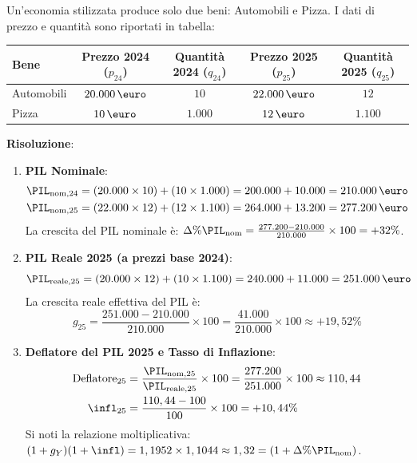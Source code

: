 \begin{esercizio}
Un'economia stilizzata produce solo due beni: Automobili e Pizza. I dati di prezzo e quantità sono riportati in tabella:
\begin{center}
\small
\begin{tabular}{lcccc}
\toprule
\textbf{Bene} & \textbf{Prezzo 2024 ($p_{24}$)} & \textbf{Quantità 2024 ($q_{24}$)} & \textbf{Prezzo 2025 ($p_{25}$)} & \textbf{Quantità 2025 ($q_{25}$)} \\
\midrule
Automobili & $20.000\,\text{\euro}$ & $10$ & $22.000\,\text{\euro}$ & $12$ \\
Pizza      & $10\,\text{\euro}$     & $1.000$ & $12\,\text{\euro}$     & $1.100$ \\
\bottomrule
\end{tabular}
\end{center}

\textbf{Risoluzione}:
\begin{enumerate}
    \item \textbf{PIL Nominale}:
    \begin{align*}
        \PIL_{\text{nom}, 24} &= (20.000 \times 10) + (10 \times 1.000) = 200.000 + 10.000 = 210.000\,\text{\euro} \\
        \PIL_{\text{nom}, 25} &= (22.000 \times 12) + (12 \times 1.100) = 264.000 + 13.200 = 277.200\,\text{\euro}
    \end{align*}
    La crescita del PIL nominale è: $\Delta\% \PIL_{\text{nom}} = \frac{277.200 - 210.000}{210.000} \times 100 = +32\%$.
    
    \item \textbf{PIL Reale 2025 (a prezzi base 2024)}:
    \begin{equation*}
        \PIL_{\text{reale}, 25} = (20.000 \times 12) + (10 \times 1.100) = 240.000 + 11.000 = 251.000\,\text{\euro}
    \end{equation*}
    La crescita reale effettiva del PIL è:
    \begin{equation*}
        g_{25} = \frac{251.000 - 210.000}{210.000} \times 100 = \frac{41.000}{210.000} \times 100 \approx +19,52\%
    \end{equation*}
    
    \item \textbf{Deflatore del PIL 2025 e Tasso di Inflazione}:
    \begin{align*}
        \text{Deflatore}_{25} &= \frac{\PIL_{\text{nom}, 25}}{\PIL_{\text{reale}, 25}} \times 100 = \frac{277.200}{251.000} \times 100 \approx 110,44 \\
        \infl_{25} &= \frac{110,44 - 100}{100} \times 100 = +10,44\%
    \end{align*}
    Si noti la relazione moltiplicativa: $(1 + g_Y)(1 + \infl) = 1,1952 \times 1,1044 \approx 1,32 = (1 + \Delta\% \PIL_{\text{nom}})$.
\end{enumerate}
\end{esercizio}

